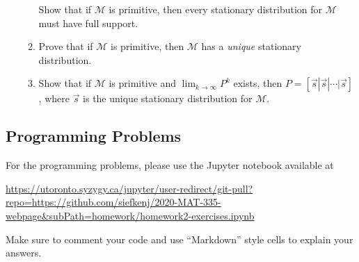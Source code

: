 \documentclass[letter]{article}
\begin{document}
\begin{enumerate}
\begin{enumerate}
				\smallskip
				Show that if $\mathcal M$ is primitive, then every stationary distribution for $\mathcal M$
				must have full support.
			\item Prove that if $\mathcal M$ is primitive, then $\mathcal M$ has a \emph{unique} stationary distribution.
			\item Show that if $\mathcal M$ is primitive and $\lim_{k\to\infty} P^k$ exists, then $P=[\vec s|\vec s|\cdots|\vec s]$,
				where $\vec s$ is the unique stationary distribution for $\mathcal M$.
		\end{enumerate}


	\end{enumerate}


	\subsection*{Programming Problems}
	For the programming problems, please use the Jupyter notebook available at

	\url{https://utoronto.syzygy.ca/jupyter/user-redirect/git-pull?repo=https://github.com/siefkenj/2020-MAT-335-webpage&subPath=homework/homework2-exercises.ipynb}

	Make sure to comment your code and use ``Markdown'' style cells to explain your answers.
\end{document}
